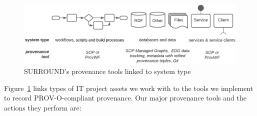 \documentclass[letterpaper,twocolumn,10pt]{article}
\begin{document}
\begin{figure}[ht]
  \begin{center}
    \includegraphics[width=\textwidth]{images/overview.png}
  \end{center}
  \caption{\label{fig:overview} SURROUND's provenance tools linked to system type}
  \end{figure}

Figure~\ref{fig:overview} links types of IT project assets we work with to the tools we implement
to record PROV-O-compliant provenance. Our major provenance tools and the actions they perform are:
\end{document}

